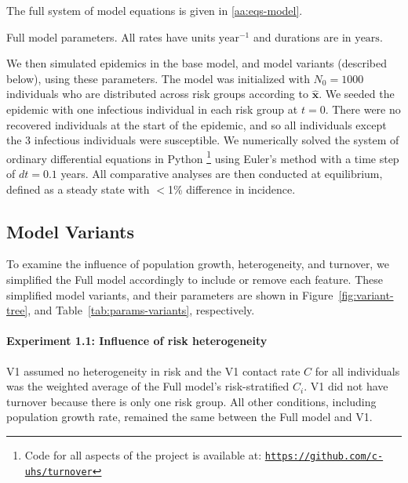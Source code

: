 The full system of model equations is given in \ref{aa:eqs-model}.
\begin{table}
  \centering
  \caption{Full model parameters.
    All rates have units $\mathrm{year}^{-1}$ and durations are in $\mathrm{years}$.}
  \label{tab:params-base}
  
\end{table}
\par
We then simulated epidemics in the base model,
and model variants (described below), using these parameters.
The model was initialized with $N_0 = 1000$ individuals
who are distributed across risk groups according to $\bm{\hat{x}}$.
We seeded the epidemic with
one infectious individual in each risk group at $t = 0$.
There were no recovered individuals at the start of the epidemic,
and so all individuals except the 3 infectious individuals were susceptible.
We numerically solved the system of ordinary differential equations
in Python%
\footnote{Code for all aspects of the project is available at:
  \href{https://github.com/c-uhs/turnover}{\texttt{https://github.com/c-uhs/turnover}}}
using Euler's method with a time step of $dt = 0.1$ years.
All comparative analyses are then conducted at equilibrium,
defined as a steady state with $<$1\% difference in incidence.
\subsection{Model Variants}\label{ss:exp-variants}
To examine the influence of population growth, heterogeneity, and turnover,
we simplified the Full model accordingly to include or remove each feature.
These simplified model variants, and their parameters are shown in
Figure~\ref{fig:variant-tree}, and
Table~\ref{tab:params-variants}, respectively.
\paragraph{Experiment 1.1: Influence of risk heterogeneity}
\label{p:exp-1-hetero}
V1 assumed no heterogeneity in risk and
the V1 contact rate $C$ for all individuals was the weighted
average of the Full model's risk-stratified $C_i$.
V1 did not have turnover because there is only one risk group.
All other conditions, including population growth rate, remained the same between
the Full model and V1.
